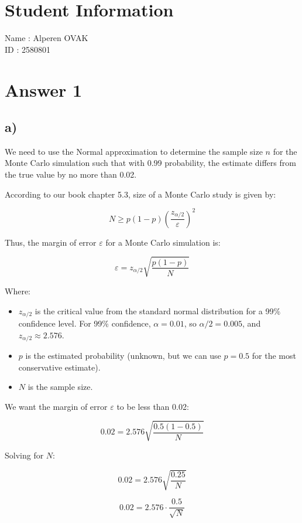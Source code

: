 \documentclass[12pt]{article}
\begin{document}
\section*{Student Information}

Name : Alperen OVAK \\

ID : 2580801\\


\section*{Answer 1}
\subsection*{a)} 

We need to use the Normal approximation to determine the sample size \( n \) for the Monte Carlo simulation such that with 0.99 probability, the estimate differs from the true value by no more than 0.02.

According to our book chapter 5.3, size of a Monte Carlo study is given by:

\[ N \geq p(1-p){\left(\frac{z_{\alpha/2}}{\varepsilon}\right) }^2 \]

Thus, the margin of error \( \varepsilon  \) for a Monte Carlo simulation is:

\[ \varepsilon  = z_{\alpha/2} \sqrt{\frac{p(1-p)}{N}} \]

Where:
\begin{itemize}
    \item \( z_{\alpha/2} \) is the critical value from the standard normal distribution for a 99\% confidence level. For 99\% confidence, \( \alpha = 0.01 \), so \( \alpha/2 = 0.005 \), and \( z_{\alpha/2} \approx 2.576 \).
    \item \( p \) is the estimated probability (unknown, but we can use \( p = 0.5 \) for the most conservative estimate).
    \item \( N \) is the sample size.
\end{itemize}


We want the margin of error \( \varepsilon  \) to be less than 0.02:

\[ 0.02 = 2.576 \sqrt{\frac{0.5(1-0.5)}{N}} \]

Solving for \( N \):

\[ 0.02 = 2.576 \sqrt{\frac{0.25}{N}} \]

\[ 0.02 = 2.576 \cdot \frac{0.5}{\sqrt{N}} \]
\end{document}
